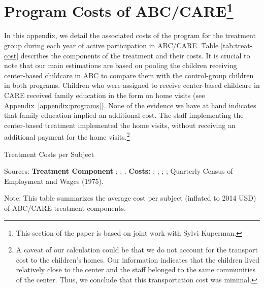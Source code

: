 \section[Program Costs of ABC/CARE]{Program Costs of ABC/CARE\footnote{This section of the paper is based on joint work with Sylvi Kuperman.}} \label{app:programcosts}

\noindent In this appendix, we detail the associated costs of the program for the treatment group during each year of active participation in ABC/CARE. Table \ref{tab:treat-cost}  describes the components of the treatment and their costs. It is crucial to note that our main estimations are based on pooling the children receiving center-based childcare in ABC to compare them with the control-group children in both programs. Children who were assigned to receive center-based childcare in CARE received family education in the form on home visits (see Appendix~\ref{appendix:programs}). None of the evidence we have at hand indicates that family education implied an additional cost. The staff implementing the center-based treatment implemented the home visits, without receiving an additional payment for the home visits.\footnote{A caveat of our calculation could be that we do not account for the transport cost to the children's homes. Our information indicates that the children lived relatively close to the center and the staff belonged to the same communities of the center. Thus, we conclude that this transportation cost was minimal.} \\

\begin{table}[H]
\caption{Treatment Costs per Subject} \label{tab:treat-cost}
\centering
\begin{adjustbox}{max width=\textwidth}
\begin{threeparttable}
\scriptsize

\begin{tablenotes}
\scriptsize
\item Sources: \textbf{Treatment Component} \cite{Ramey_Collier_etal_1976_CarolinaAbecedarianProject}; \cite{Ramey_McGinness_etal_1982_Abecedarianapproach}; \cite{Clarke_Campbell_1998_ABC_Comparison_ECRQ}. \textbf{Costs:} \cite{Barnett_Masse_2002_benefitcost}; \cite{FPGC_Progress-Report_1973}; \cite{Cutler_Meara_1998_Med-Costs_BOOK}; \cite{Helburn_1995_Childcare-Report}; Quarterly Census of Employment and Wages (1975).

\item Note: This table summarizes the average cost per subject (inflated to 2014 USD) of ABC/CARE treatment components.
\end{tablenotes}
\end{threeparttable}
\end{adjustbox}
\end{table}

